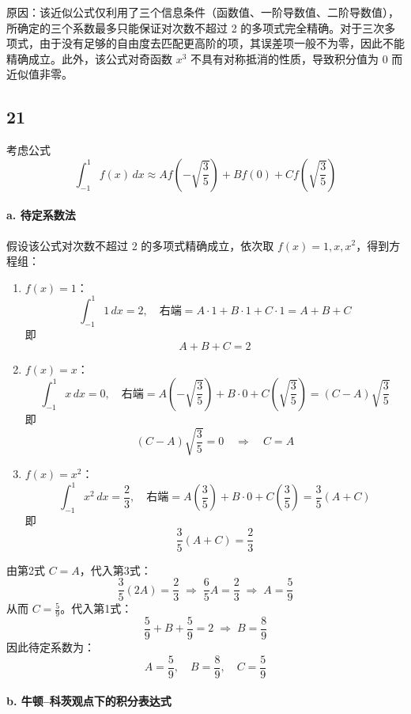 \documentclass{article}
\begin{document}
原因：该近似公式仅利用了三个信息条件（函数值、一阶导数值、二阶导数值），所确定的三个系数最多只能保证对次数不超过 2 的多项式完全精确。对于三次多项式，由于没有足够的自由度去匹配更高阶的项，其误差项一般不为零，因此不能精确成立。此外，该公式对奇函数 \( x^3 \) 不具有对称抵消的性质，导致积分值为 0 而近似值非零。

\subsection*{21}

考虑公式
\[
\int_{-1}^1 f(x)\,dx \approx A f\!\left(-\sqrt{\frac{3}{5}}\right) + B f(0) + C f\!\left(\sqrt{\frac{3}{5}}\right)
\]

\paragraph{a. 待定系数法}

假设该公式对次数不超过 2 的多项式精确成立，依次取 \(f(x) = 1, x, x^2\)，得到方程组：

\begin{enumerate}
    \item \(f(x)=1\)：
    \[
    \int_{-1}^1 1\,dx = 2,\quad \text{右端} = A\cdot 1 + B\cdot 1 + C\cdot 1 = A+B+C
    \]
    即
    \[
    A + B + C = 2
    \]

    \item \(f(x)=x\)：
    \[
    \int_{-1}^1 x\,dx = 0,\quad \text{右端} = A\left(-\sqrt{\frac{3}{5}}\right) + B\cdot 0 + C\left(\sqrt{\frac{3}{5}}\right) = (C-A)\sqrt{\frac{3}{5}}
    \]
    即
    \[
    (C-A)\sqrt{\frac{3}{5}} = 0 \quad\Longrightarrow\quad C = A
    \]

    \item \(f(x)=x^2\)：
    \[
    \int_{-1}^1 x^2\,dx = \frac{2}{3},\quad \text{右端} = A\left(\frac{3}{5}\right) + B\cdot 0 + C\left(\frac{3}{5}\right) = \frac{3}{5}(A+C)
    \]
    即
    \[
    \frac{3}{5}(A+C) = \frac{2}{3}
    \]
\end{enumerate}

由第2式 \(C=A\)，代入第3式：
\[
\frac{3}{5}(2A) = \frac{2}{3} \;\Longrightarrow\; \frac{6}{5}A = \frac{2}{3} \;\Longrightarrow\; A = \frac{5}{9}
\]
从而 \(C = \frac{5}{9}\)。代入第1式：
\[
\frac{5}{9} + B + \frac{5}{9} = 2 \;\Longrightarrow\; B = \frac{8}{9}
\]
因此待定系数为：
\[
\boxed{A = \frac{5}{9},\quad B = \frac{8}{9},\quad C = \frac{5}{9}}
\]

\paragraph{b. 牛顿–科茨观点下的积分表达式}
\end{document}
